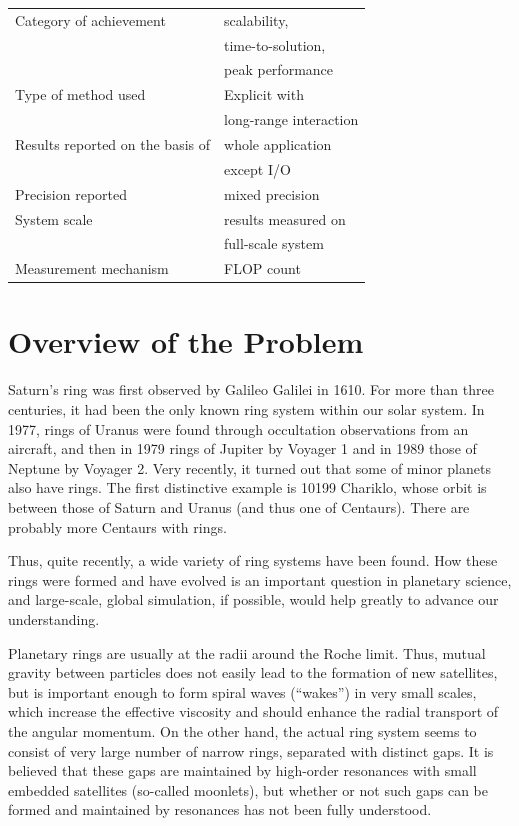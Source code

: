 \documentclass[conference]{IEEEtran}
\begin{document}
  \begin{tabular}{ll}
    \hline
    Category of achievement&  scalability,\\
                            &time-to-solution,\\
                           &peak performance\\
    Type of method used & Explicit with\\
                        &long-range interaction\\    
    Results reported on the basis of&  whole application\\
                                  &except I/O\\
     Precision reported &  mixed precision\\
     System scale & results measured on \\
                  &full-scale system\\
    Measurement mechanism &   FLOP count\\

 \hline
\end{tabular}

  \section{Overview of the Problem}
  \label{sect:overview}


  

Saturn's ring was first observed by Galileo Galilei in 1610. For more
than three centuries, it had been the only known ring system within
our solar system. In 1977, rings of Uranus were found through
occultation observations from an aircraft, and then in 1979 rings of
Jupiter by Voyager 1 and in 1989 those of Neptune by Voyager 2.  Very
recently, it turned out that some of minor planets also have
rings. The first distinctive example is 10199 Chariklo, whose orbit is
between those of Saturn and Uranus (and thus one of Centaurs). There
are probably more Centaurs with rings.

Thus, quite recently, a wide variety of ring systems have been found.
How these rings were formed and have evolved is an important question
in planetary science, and large-scale, global simulation, if possible,
would help greatly to advance our understanding.

Planetary rings are usually at the radii around the Roche limit. Thus,
mutual gravity between particles does not easily lead to the formation
of new satellites, but is important enough to form spiral waves
(``wakes'') in very small scales, which increase the effective
viscosity and should enhance the radial transport of the angular
momentum. On the other hand, the actual ring system seems to consist
of very large number of narrow rings, separated with distinct gaps. It
is believed that these gaps are maintained by high-order resonances
with small embedded satellites (so-called moonlets), but whether or
not such gaps can be formed and maintained by resonances has not been
fully understood.
\end{document}
